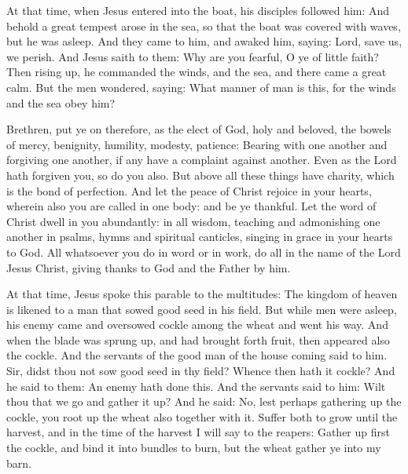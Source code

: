 At that time, when Jesus entered into the boat, his disciples followed him: And behold a
great tempest arose in the sea, so that the boat was covered with waves, but he
was asleep.  And they came to him, and awaked him, saying: Lord, save us, we
perish.  And Jesus saith to them: Why are you fearful, O ye of little faith?
Then rising up, he commanded the winds, and the sea, and there came a great
calm.  But the men wondered, saying: What manner of man is this, for the winds
and the sea obey him?





Brethren, put ye on therefore, as the elect of God, holy and beloved, the bowels of
mercy, benignity, humility, modesty, patience: Bearing with one another and
forgiving one another, if any have a complaint against another. Even as the
Lord hath forgiven you, so do you also.  But above all these things have
charity, which is the bond of perfection.  And let the peace of Christ rejoice
in your hearts, wherein also you are called in one body: and be ye thankful.
Let the word of Christ dwell in you abundantly: in all wisdom, teaching and
admonishing one another in psalms, hymns and spiritual canticles, singing in
grace in your hearts to God.  All whatsoever you do in word or in work, do all
in the name of the Lord Jesus Christ, giving thanks to God and the Father by
him.



At that time, Jesus spoke this parable to the multitudes: The kingdom of heaven is likened
to a man that sowed good seed in his field.  But while men were asleep, his
enemy came and oversowed cockle among the wheat and went his way.  And when the
blade was sprung up, and had brought forth fruit, then appeared also the
cockle.  And the servants of the good man of the house coming said to him.
Sir, didst thou not sow good seed in thy field? Whence then hath it cockle?
And he said to them: An enemy hath done this. And the servants said to him:
Wilt thou that we go and gather it up?  And he said: No, lest perhaps gathering
up the cockle, you root up the wheat also together with it.  Suffer both to
grow until the harvest, and in the time of the harvest I will say to the
reapers: Gather up first the cockle, and bind it into bundles to burn, but the
wheat gather ye into my barn.

